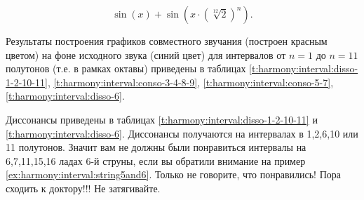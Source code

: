 \begin{equation}
    \label{eq:harmony:interval:sin}
    \sin(x) + \sin(x\cdot(\sqrt[12]{2})^n).
\end{equation}

Результаты построения графиков совместного звучания (построен красным цветом) на фоне исходного звука (синий цвет) для интервалов от $n=1$ до $n=11$ полутонов (т.е. в рамках октавы) приведены в таблицах \ref{t:harmony:interval:disso-1-2-10-11}, \ref{t:harmony:interval:conso-3-4-8-9}, \ref{t:harmony:interval:conso-5-7}, \ref{t:harmony:interval:disso-6}.

Диссонансы приведены в таблицах \ref{t:harmony:interval:disso-1-2-10-11} и \ref{t:harmony:interval:disso-6}. Диссонансы получаются на интервалах в 1,2,6,10 или 11 полутонов. Значит вам не должны были понравиться интервалы на 6,7,11,15,16 ладах 6-й струны, если вы обратили внимание на пример \ref{ex:harmony:interval:string5and6}. Только не говорите, что понравились! Пора сходить к доктору!!! Не затягивайте. 

